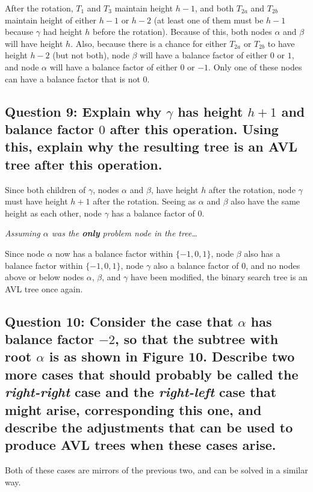 \documentclass[a4paper, 12pt, titlepage]{article}
\begin{document}
After the rotation,
$T_1$ and $T_3$ maintain height $h-1$,
and both $T_{2a}$ and $T_{2b}$ maintain height of either $h-1$ or $h-2$
(at least one of them must be $h-1$ because $\gamma$ had height $h$ before the rotation).
Because of this,
both nodes $\alpha$ and $\beta$ will have height $h$.
Also,
because there is a chance for either $T_{2a}$ or $T_{2b}$ to have height $h-2$
(but not both),
node $\beta$ will have a balance factor of either $0$ or $1$,
and node $\alpha$ will have a balance factor of either $0$ or $-1$.
Only one of these nodes can have a balance factor that is not $0$.

\subsection*{Question 9: Explain why $\gamma$ has height $h+1$ and balance factor $0$ after this operation. Using this, explain why the resulting tree is an AVL tree after this operation.} 

Since both children of $\gamma$,
nodes $\alpha$ and $\beta$,
have height $h$ after the rotation,
node $\gamma$ must have height $h+1$ after the rotation.
Seeing as $\alpha$ and $\beta$ also have the same height as each other,
node $\gamma$ has a balance factor of $0$.

\textit{Assuming $\alpha$ was the \textbf{only} problem node in the tree\ldots}

Since node $\alpha$ now has a balance factor within $\{−1, 0, 1\}$,
node $\beta$ also has a balance factor within $\{−1, 0, 1\}$,
node $\gamma$ also a balance factor of $0$,
and no nodes above or below nodes $\alpha$, $\beta$, and $\gamma$ have been modified,
the binary search tree is an AVL tree once again.

\subsection*{Question 10: Consider the case that $\alpha$ has balance factor $-2$, so that the subtree with root $\alpha$ is as shown in Figure 10. Describe two more cases that should probably be called the \textit{right-right} case and the \textit{right-left} case that might arise, corresponding this one, and describe the adjustments that can be used to produce AVL trees when these cases arise.} 

Both of these cases are mirrors of the previous two,
and can be solved in a similar way.
\end{document}
